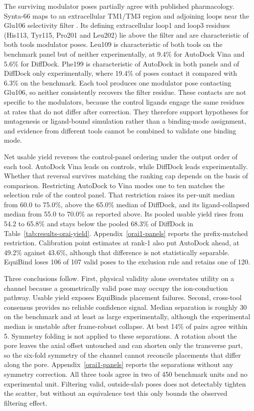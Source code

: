 The surviving modulator poses partially agree with published pharmacology. Synta-66 maps to an extracellular TM1/TM3 region and adjoining loops near the Glu106 selectivity filter \cite{ref071}. Its defining extracellular loop1 and loop3 residues (His113, Tyr115, Pro201 and Leu202) lie above the filter and are characteristic of both tools\textquotesingle{} modulator poses. Leu109 is characteristic of both tools on the benchmark panel but of neither experimentally, at 9.4\% for AutoDock Vina and 5.6\% for DiffDock. Phe199 is characteristic of AutoDock in both panels and of DiffDock only experimentally, where 19.4\% of poses contact it compared with 6.3\% on the benchmark. Each tool produces one modulator pose contacting Glu106, so neither consistently recovers the filter residue. These contacts are not specific to the modulators, because the control ligands engage the same residues at rates that do not differ after correction. They therefore support hypotheses for mutagenesis or ligand-bound simulation rather than a binding-mode assignment, and evidence from different tools cannot be combined to validate one binding mode.

Net usable yield reverses the control-panel ordering under the output order of each tool. AutoDock Vina leads on controls, while DiffDock leads experimentally. Whether that reversal survives matching the ranking cap depends on the basis of comparison. Restricting AutoDock to Vina modes one to ten matches the selection rule of the control panel. That restriction raises its per-unit median from 60.0 to 75.0\%, above the 65.0\% median of DiffDock, and its ligand-collapsed median from 55.0 to 70.0\% as reported above. Its pooled usable yield rises from 54.2 to 65.8\% and stays below the pooled 68.3\% of DiffDock in Table~\ref{tab:results-orai-yield}. Appendix~\ref{orai1-panels} reports the prefix-matched restriction. Calibration point estimates at rank-1 also put AutoDock ahead, at 49.2\% against 43.6\%, although that difference is not statistically separable. EquiBind loses 106 of 107 valid poses to the exclusion rule and retains one of 120.

Three conclusions follow. First, physical validity alone overstates utility on a channel because a geometrically valid pose may occupy the ion-conduction pathway. Usable yield exposes EquiBind\textquotesingle s placement failures. Second, cross-tool consensus provides no reliable confidence signal. Median separation is roughly 30\angstrom{} on the benchmark and at least as large experimentally, although the experimental median is unstable after frame-robust collapse. At best 14\% of pairs agree within 5\angstrom{}. Symmetry folding is not applied to these separations. A rotation about the pore leaves the axial offset untouched and can shorten only the transverse part, so the six-fold symmetry of the channel cannot reconcile placements that differ along the pore. Appendix~\ref{orai1-panels} reports the separations without any symmetry correction. All three tools agree in two of 450 benchmark units and no experimental unit. Filtering valid, outside-slab poses does not detectably tighten the scatter, but without an equivalence test this only bounds the observed filtering effect.

